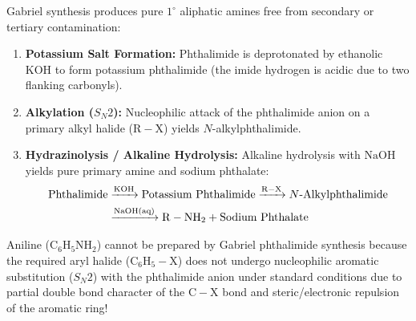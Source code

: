 \documentclass[10pt,twoside,openright]{book}
\begin{document}
\begin{conceptbox}
Gabriel synthesis produces pure $1^\circ$ aliphatic amines free from secondary or tertiary contamination:
\begin{enumerate}[leftmargin=*]
  \item \textbf{Potassium Salt Formation:} Phthalimide is deprotonated by ethanolic $\mathrm{KOH}$ to form potassium phthalimide (the imide hydrogen is acidic due to two flanking carbonyls).
  \item \textbf{Alkylation ($S_N2$):} Nucleophilic attack of the phthalimide anion on a primary alkyl halide ($\mathrm{R-X}$) yields $N$-alkylphthalimide.
  \item \textbf{Hydrazinolysis / Alkaline Hydrolysis:} Alkaline hydrolysis with $\mathrm{NaOH}$ yields pure primary amine and sodium phthalate:
  \begin{align}
    \text{Phthalimide} &\xrightarrow{\mathrm{KOH}} \text{Potassium Phthalimide} \xrightarrow{\mathrm{R-X}} N\text{-Alkylphthalimide} \notag \\
    &\xrightarrow{\mathrm{NaOH(aq)}} \mathbf{\mathrm{R-NH_2}} + \text{Sodium Phthalate}
  \end{align}
\end{enumerate}
\end{conceptbox}

\begin{trapbox}
Aniline ($\mathrm{C_6H_5NH_2}$) cannot be prepared by Gabriel phthalimide synthesis because the required aryl halide ($\mathrm{C_6H_5-X}$) does not undergo nucleophilic aromatic substitution ($S_N2$) with the phthalimide anion under standard conditions due to partial double bond character of the $\mathrm{C-X}$ bond and steric/electronic repulsion of the aromatic ring!
\end{trapbox}
\end{document}
